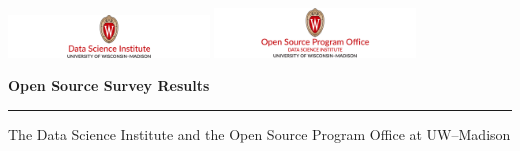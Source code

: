 \begin{titlepage}
\centering
\thispagestyle{empty}

\vspace*{1cm}

\includegraphics[width=0.4\textwidth]{images/DATASCIE_color-center.png}
\hspace{1cm}
\includegraphics[width=0.4\textwidth]{images/OPENSOURDA_color-center.png}

\vspace{2cm}

{\Huge\bfseries\color{uwred} Open Source Survey Results\par}

\vspace{0.4cm}

\noindent\textcolor{uwred}{\rule{0.8\textwidth}{2pt}}

\vspace{0.4cm}

{\LARGE\color{uwgray} The Data Science Institute and the Open Source Program Office at UW--Madison\par}

\vspace{2.5cm}

\begin{center}
\end{center}


\end{titlepage}
